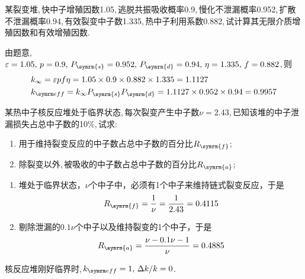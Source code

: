 \begin{exercise}
    某裂变堆,\,快中子增殖因数1.05,\,逃脱共振吸收概率0.9,\,慢化不泄漏概率0.952,\,扩散不泄漏概率0.94,\,有效裂变中子数1.335,\,热中子利用系数0.882,\,试计算其无限介质增殖因数和有效增殖因数.\,
    \begin{solution}
        由题意,\,$\varepsilon = 1.05,\,p=0.9,\,P_{\symrm{s}}=0.952,\,P_{\symrm{d}}=0.94,\,\eta=1.335,\,f=0.882$,\,则
        \begin{align*}
            &k_{\infty} = \varepsilon p f \eta = 1.05 \times 0.9 \times 0.882 \times 1.335 = 1.1127 \\
            &\keff = k_{\infty} P_{\symrm{s}} P_{\symrm{d}} = 1.1127 \times 0.952 \times 0.94 = 0.9957
        \end{align*}
    \end{solution}
\end{exercise}

\begin{exercise}
    某热中子核反应堆处于临界状态,\,每次裂变产生中子数$\nu = 2.43$,\,已知该堆的中子泄漏损失占总中子数的10\%,\,试求:\,
    \begin{enumerate}[(1)]
        \item 用于维持裂变反应的中子数占总中子数的百分比$R_{\symrm{f}}$;
        \item 除裂变以外,\,被吸收的中子数占总中子数的百分比$R_{\symrm{a}}$; 
    \end{enumerate}
    \begin{solution}
        \begin{enumerate}[(1)]
            \item 堆处于临界状态，$\nu$个中子中，必须有1个中子来维持链式裂变反应，于是
            \begin{equation*}
                R_{\symrm{f}} = \frac{1}{\nu} = \frac{1}{2.43} = 0.4115
            \end{equation*}
            \item 剔除泄漏的$0.1\nu$个中子以及维持裂变的1个中子，于是
            \begin{equation*}
                R_{\symrm{a}} = \frac{\nu - 0.1\nu - 1}{\nu} = 0.4885
            \end{equation*}
        \end{enumerate}
    \end{solution}
\end{exercise}

\begin{exercise}
    核反应堆刚好临界时,\,$\keff = 1,\,\Delta k/k = 0$.
\end{exercise}

